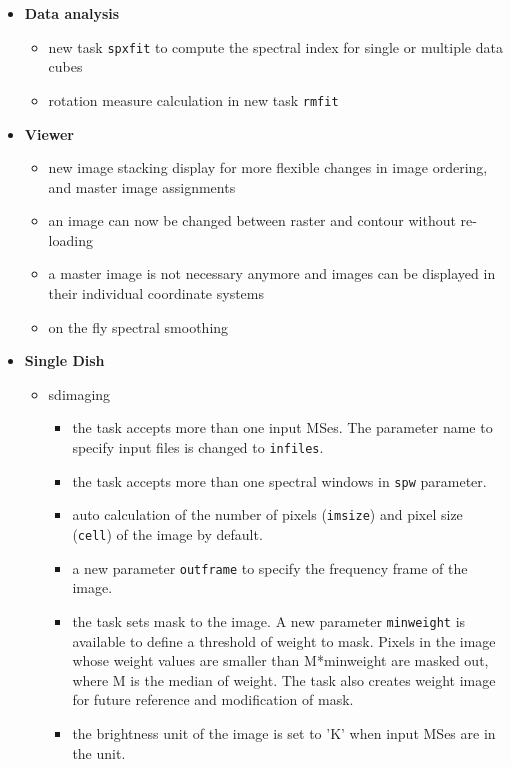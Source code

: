 \begin{itemize}
\begin{itemize}
\end{itemize} 

\item  {\bf Data analysis}
\begin{itemize} 
  
   \item  new task {\tt spxfit} to compute the spectral index for single or multiple data cubes 
   \item  rotation measure calculation in new task {\tt rmfit} 
\end{itemize} 


\item  {\bf Viewer}

\begin{itemize} 
  \item  new image stacking display for more flexible changes in image ordering, and master image assignments
  \item  an image can now be changed between raster and contour without re-loading
  \item  a master image is not necessary anymore and images can be displayed in their individual coordinate systems
  \item  on the fly spectral smoothing



\end{itemize} 

\item {\bf Single Dish}
\begin{itemize} 

  \item sdimaging
       \begin{itemize} 
        \item the task accepts more than one input MSes. The parameter name to
specify input files is changed to {\tt infiles}.
         \item the task accepts more than one spectral windows in {\tt spw} parameter.
          \item  auto calculation of the number of pixels ({\tt imsize}) and pixel size
({\tt cell}) of the image by default.
          \item  a new parameter {\tt outframe} to specify the frequency frame of the
image.
          \item  the task sets mask to the image. A new parameter {\tt minweight} is
available to define a threshold of weight to mask. Pixels in the image
whose weight values are smaller than M*minweight are masked out, where M
is the median of weight. The task also creates weight image for future
reference and modification of mask.
          \item  the brightness unit of the image is set to 'K' when input MSes are in
the unit.
  \end{itemize} 
    

\end{itemize}
\end{itemize}
